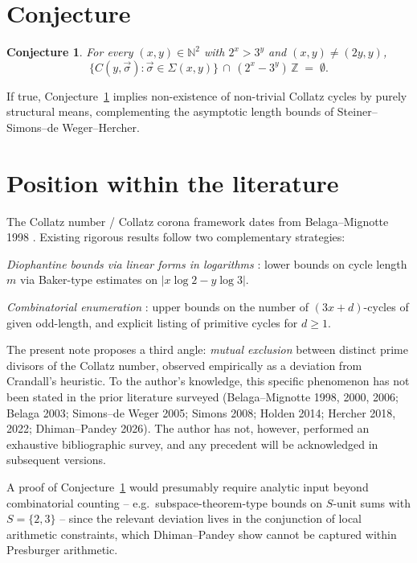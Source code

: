 \documentclass[11pt,a4paper]{article}
\theoremstyle{plain}
\newtheorem{conjecture}{Conjecture}
\theoremstyle{definition}
\begin{document}
\section{Conjecture}

\begin{conjecture}\label{conj:main}
For every $(x, y) \in \mathbb{N}^2$ with $2^x > 3^y$ and $(x, y) \ne (2y, y)$,
\[
\bigl\{C(y, \vec\sigma) : \vec\sigma \in \Sigma(x, y)\bigr\} \,\cap\, (2^x - 3^y)\,\mathbb{Z} \;=\; \emptyset.
\]
\end{conjecture}

If true, Conjecture~\ref{conj:main} implies non-existence of non-trivial Collatz cycles by purely structural means, complementing the asymptotic length bounds of Steiner--Simons--de Weger--Hercher.

\section{Position within the literature}

The Collatz number / Collatz corona framework dates from Belaga--Mignotte 1998 \cite{belaga1998}. Existing rigorous results follow two complementary strategies:

\noindent\emph{Diophantine bounds via linear forms in logarithms} \cite{steiner1977,sdw2005,simons2008,hercher2022}: lower bounds on cycle length $m$ via Baker-type estimates on $|x \log 2 - y \log 3|$.

\noindent\emph{Combinatorial enumeration} \cite{belaga2003,belaga2006,holden2014}: upper bounds on the number of $(3x+d)$-cycles of given odd-length, and explicit listing of primitive cycles for $d \ge 1$.

The present note proposes a third angle: \emph{mutual exclusion} between distinct prime divisors of the Collatz number, observed empirically as a deviation from Crandall's heuristic. To the author's knowledge, this specific phenomenon has not been stated in the prior literature surveyed (Belaga--Mignotte 1998, 2000, 2006; Belaga 2003; Simons--de Weger 2005; Simons 2008; Holden 2014; Hercher 2018, 2022; Dhiman--Pandey 2026). The author has not, however, performed an exhaustive bibliographic survey, and any precedent will be acknowledged in subsequent versions.

A proof of Conjecture~\ref{conj:main} would presumably require analytic input beyond combinatorial counting -- e.g.\ subspace-theorem-type bounds on $S$-unit sums with $S = \{2, 3\}$ \cite{schmidt1980,evertse1999} -- since the relevant deviation lives in the conjunction of local arithmetic constraints, which Dhiman--Pandey \cite{dhiman2026} show cannot be captured within Presburger arithmetic.
\end{document}
